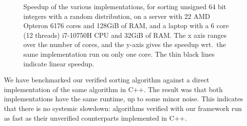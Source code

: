 \documentclass[a4paper,UKenglish,cleveref, autoref, thm-restate]{lipics-v2021}
\begin{document}
  \begin{figure}

  \hfill
  \caption{Speedup of the various implementations, for sorting unsigned 64 bit integers with a random distribution, on
    a server with 22 AMD Opteron 6176 cores and 128GiB of RAM, and a laptop with a
    6 core (12 threads) i7-10750H CPU and 32GiB of RAM.
    The x axis ranges over the number of cores, and the y-axis gives the speedup wrt.\ the same implementation run on only one core.
    The thin black lines indicate linear speedup.
  }\label{fig:speedup}

  \end{figure}




  We have benchmarked our verified sorting algorithm against a direct implementation of the same algorithm in C++.
  The result was that both implementations have the same runtime, up to some minor noise.
  This indicates that there is no systemic slowdown: algorithms verified with our framework run as fast as their unverified counterparts implemented in C++.
\end{document}
